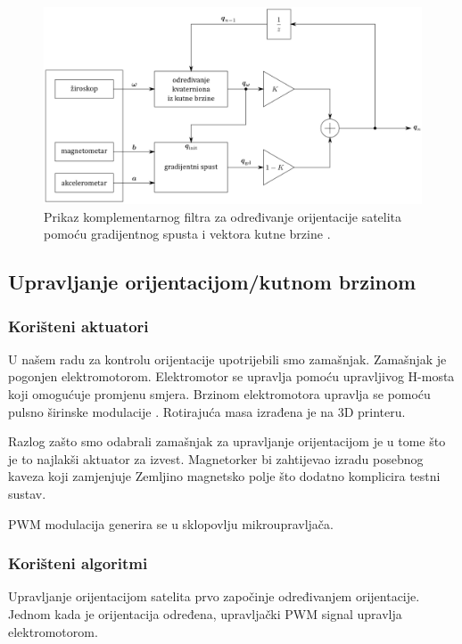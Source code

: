 \documentclass[times, utf8, diplomski, numeric]{templates/template}
\begin{document}
{{{{                \begin{figure}[htb]
                \centering
                \includegraphics[width=1.0\textwidth]{images/komp_filt_fig.png}
                \caption{Prikaz komplementarnog filtra za određivanje orijentacije satelita pomoću gradijentnog spusta i vektora kutne brzine \cite{uvod_u_svemirske}.}
                \label{fig:komp_filt_fig}
                \end{figure}
            }
        }

        \subsection{Upravljanje orijentacijom/kutnom brzinom}{
            \subsubsection{Korišteni aktuatori}{
                U našem radu za kontrolu orijentacije upotrijebili smo zamašnjak. Zamašnjak je pogonjen elektromotorom. Elektromotor se upravlja pomoću upravljivog H-mosta koji omogućuje promjenu smjera. Brzinom elektromotora upravlja se pomoću pulsno širinske modulacije . Rotirajuća masa izrađena je na 3D printeru.

                Razlog zašto smo odabrali zamašnjak za upravljanje orijentacijom je u tome što je to najlakši aktuator za izvest. Magnetorker bi zahtijevao izradu posebnog kaveza koji zamjenjuje Zemljino magnetsko polje što dodatno komplicira testni sustav.

                PWM modulacija generira se u sklopovlju mikroupravljača.
            }

            \subsubsection{Korišteni algoritmi}{
                Upravljanje orijentacijom satelita prvo započinje određivanjem orijentacije. Jednom kada je orijentacija određena, upravljački PWM signal upravlja elektromotorom.

}}}}
\end{document}
